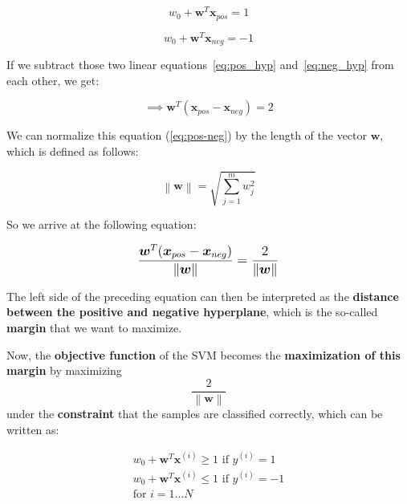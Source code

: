 \documentclass[11pt]{article}
\newcommand{\norm}[1]{\left\lVert#1\right\rVert}
\newcommand{\vect}[1]{\boldsymbol{#1}}
\begin{document}
    \begin{equation}
        \label{eq:pos_hyp}
        w_0 + \vect{w}^T \vect{x}_{pos} = 1
    \end{equation}

    \begin{equation}
        \label{eq:neg_hyp}
        w_0 + \vect{w}^T \vect{x}_{neg} = -1
    \end{equation}

    If we subtract those two linear equations~\ref{eq:pos_hyp} and~\ref{eq:neg_hyp} from each other, we get:

    \begin{equation}
        \label{eq:pos-neg}
        \implies \vect{w}^T (\vect{x}_{pos} - \vect{x}_{neg}) = 2
    \end{equation}

    We can normalize this equation (\ref{eq:pos-neg}) by the length of the vector $\vect{w}$, which is defined as follows:

    \begin{equation}
        \label{eq:vect_norm}
        \norm{ \vect{w} } = \sqrt{ \sum \limits_{j=1}^m w_j^2 }
    \end{equation}

    So we arrive at the following equation:

    \begin{equation}
        \label{eq:pos-neg_norm}
        \large{
        \frac{ \vect{w}^T ( \vect{x}_{pos} - \vect{x}_{neg} ) } { \norm{ \vect{w} } }
        = \frac{2} { \norm{ \boldsymbol{w} } }
        }
    \end{equation}

    The left side of the preceding equation can then be interpreted as the \textbf{distance between the positive
    and negative hyperplane}, which is the so-called \textbf{margin} that we want to maximize.

    Now, the \textbf{objective function} of the SVM becomes the \textbf{maximization of this margin} by maximizing
    \begin{equation}
        \label{eq:svm_margin}
        \frac{2} {\norm{\vect{w}}}
    \end{equation}
    under the \textbf{constraint} that the samples are classified correctly, which can be written as:

    \begin{equation}
        \label{eq:svm_constraints}
        \begin{gathered}
            w_0 + \vect{w}^T \vect{x}^{(i)} \geq 1 \text{ if } y^{(i)} = 1 \\
            w_0 + \vect{w}^T \vect{x}^{(i)} \leq 1 \text{ if } y^{(i)} = -1 \\
            \text{for } i=1 \dots N
        \end{gathered}
    \end{equation}
\end{document}
